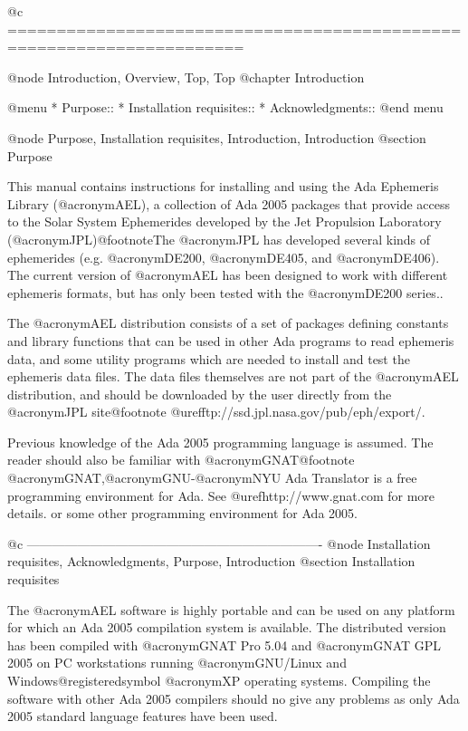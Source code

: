 @c ======================================================================

@node Introduction, Overview, Top, Top
@chapter Introduction

@menu
* Purpose::                     
* Installation requisites::     
* Acknowledgments::             
@end menu

@node Purpose, Installation requisites, Introduction, Introduction
@section Purpose

This manual contains instructions for installing and using the Ada
Ephemeris Library (@acronym{AEL}), a collection of Ada 2005 packages
that provide access to the Solar System Ephemerides developed by the
Jet Propulsion Laboratory (@acronym{JPL})@footnote{The @acronym{JPL}
has developed several kinds of ephemerides (e.g.  @acronym{DE200},
@acronym{DE405}, and @acronym{DE406}).  The current version of
@acronym{AEL} has been designed to work with different ephemeris
formats, but has only been tested with the @acronym{DE200} series.}.

The @acronym{AEL} distribution consists of a set of packages defining
constants and library functions that can be used in other Ada programs
to read ephemeris data, and some utility programs which are needed to
install and test the ephemeris data files. The data files themselves
are not part of the @acronym{AEL} distribution, and should be
downloaded by the user directly from the @acronym{JPL} site@footnote{
@uref{ftp://ssd.jpl.nasa.gov/pub/eph/export/}}.

Previous knowledge of the Ada 2005 programming language is
assumed. The reader should also be familiar with
@acronym{GNAT}@footnote{ @acronym{GNAT,@acronym{GNU}-@acronym{NYU} Ada
Translator} is a free programming environment for Ada.  See
@uref{http://www.gnat.com} for more details.} or some other
programming environment for Ada 2005.

@c ----------------------------------------------------------------------
@node    Installation requisites, Acknowledgments, Purpose, Introduction
@section Installation requisites

The @acronym{AEL} software is highly portable and can be used on any
platform for which an Ada 2005 compilation system is available. The
distributed version has been compiled with @acronym{GNAT} Pro 5.04 and
@acronym{GNAT GPL} 2005 on PC workstations running @acronym{GNU}/Linux
and Windows@registeredsymbol{} @acronym{XP} operating
systems. Compiling the software with other Ada 2005 compilers should
no give any problems as only Ada 2005 standard language features have
been used.

